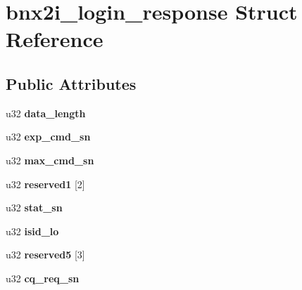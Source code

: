 \hypertarget{structbnx2i__login__response}{
\section{bnx2i\_\-login\_\-response Struct Reference}
\label{structbnx2i__login__response}
}
\subsection*{Public Attributes}
\begin{DoxyCompactItemize}
\item 
\hypertarget{structbnx2i__login__response_a4c7821fd476d5bace0b53f6f347e96fd}{
u32 {\bfseries data\_\-length}}
\label{structbnx2i__login__response_a4c7821fd476d5bace0b53f6f347e96fd}

\item 
\hypertarget{structbnx2i__login__response_a126b3526c1fd929f050b2a911b21291b}{
u32 {\bfseries exp\_\-cmd\_\-sn}}
\label{structbnx2i__login__response_a126b3526c1fd929f050b2a911b21291b}

\item 
\hypertarget{structbnx2i__login__response_a22e94f081598256d384c7bacf6edd9fe}{
u32 {\bfseries max\_\-cmd\_\-sn}}
\label{structbnx2i__login__response_a22e94f081598256d384c7bacf6edd9fe}

\item 
\hypertarget{structbnx2i__login__response_a8119f298d29c4464e81a5cbcc1401a98}{
u32 {\bfseries reserved1} \mbox{[}2\mbox{]}}
\label{structbnx2i__login__response_a8119f298d29c4464e81a5cbcc1401a98}

\item 
\hypertarget{structbnx2i__login__response_a690309dc3759c602d751c31180219c9e}{
u32 {\bfseries stat\_\-sn}}
\label{structbnx2i__login__response_a690309dc3759c602d751c31180219c9e}

\item 
\hypertarget{structbnx2i__login__response_acb3ef486a8a42b7d3e1af2f22c6b669a}{
u32 {\bfseries isid\_\-lo}}
\label{structbnx2i__login__response_acb3ef486a8a42b7d3e1af2f22c6b669a}

\item 
\hypertarget{structbnx2i__login__response_a4432cd2b45c8e449a1bad331b5bd282f}{
u32 {\bfseries reserved5} \mbox{[}3\mbox{]}}
\label{structbnx2i__login__response_a4432cd2b45c8e449a1bad331b5bd282f}

\item 
\hypertarget{structbnx2i__login__response_a0e899c09abbcd3b08ec6a9c70e212a01}{
u32 {\bfseries cq\_\-req\_\-sn}}
\label{structbnx2i__login__response_a0e899c09abbcd3b08ec6a9c70e212a01}

\end{DoxyCompactItemize}


